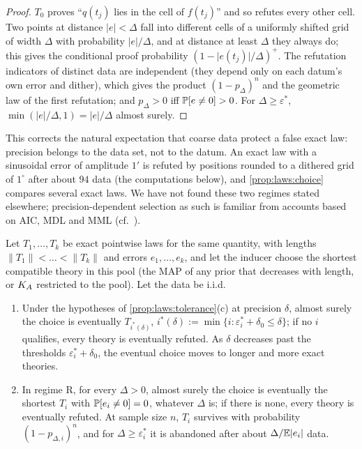 \begin{proof}
$T_0$ proves ``$q(t_j)$ lies in the cell of $f(t_j)$'' and so refutes every other cell. Two points at distance $\lvert e\rvert<\Delta$ fall into different cells of a uniformly shifted grid of width $\Delta$ with probability $\lvert e\rvert/\Delta$, and at distance at least $\Delta$ they always do; this gives the conditional proof probability $(1-\lvert e(t_j)\rvert/\Delta)^+$. The refutation indicators of distinct data are independent (they depend only on each datum's own error and dither), which gives the product $(1-p_\Delta)^n$ and the geometric law of the first refutation; and $p_\Delta>0$ iff $\mathbb{P}[e\ne0]>0$. For $\Delta\ge\varepsilon^*$, $\min(\lvert e\rvert/\Delta,1)=\lvert e\rvert/\Delta$ almost surely.
\end{proof}

This corrects the natural expectation that coarse data protect a false exact law: precision belongs to the data set, not to the datum. An exact law with a sinusoidal error of amplitude $1'$ is refuted by positions rounded to a dithered grid of $1^\circ$ after about $94$ data (the computations below), and \cref{prop:laws:choice} compares several exact laws. We have not found these two regimes stated elsewhere; precision-dependent selection as such is familiar from accounts based on AIC, MDL and MML (cf.\ \citealp{forster1994how,rissanen1978modeling,wallace2005statistical}).

\begin{proposition}\label{prop:laws:choice}
Let $T_1,\dots,T_k$ be exact pointwise laws for the same quantity, with lengths $\lVert T_1\rVert<\dots<\lVert T_k\rVert$ and errors $e_1,\dots,e_k$, and let the inducer choose the shortest compatible theory in this pool (the MAP of any prior that decreases with length, or $K_{A}$ restricted to the pool). Let the data be i.i.d.
\begin{enumerate}[label=(\alph*),itemsep=1pt,topsep=2pt]
\item[(G)] Under the hypotheses of \cref{prop:laws:tolerance}(c) at precision $\delta$, almost surely the choice is eventually $T_{i^*(\delta)}$, $i^*(\delta):=\min\{i:\varepsilon^*_i+\delta_0\le\delta\}$; if no $i$ qualifies, every theory is eventually refuted. As $\delta$ decreases past the thresholds $\varepsilon^*_i+\delta_0$, the eventual choice moves to longer and more exact theories.
\item[(R)] In regime R, for every $\Delta>0$, almost surely the choice is eventually the shortest $T_i$ with $\mathbb{P}[e_i\ne0]=0$, whatever $\Delta$ is; if there is none, every theory is eventually refuted. At sample size $n$, $T_i$ survives with probability $(1-p_{\Delta,i})^n$, and for $\Delta\ge\varepsilon^*_i$ it is abandoned after about $\Delta/\mathbb{E}\lvert e_i\rvert$ data.
\end{enumerate}
\end{proposition}

